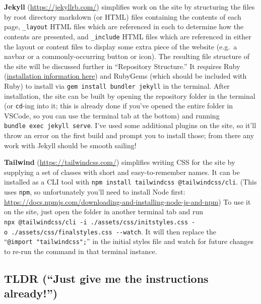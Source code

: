 \documentclass[
]{book}
\begin{document}
\textbf{Jekyll} (\url{https://jekyllrb.com/}) simplifies work on the site by structuring the files by root directory markdown (or HTML) files containing the contents of each page, \texttt{\_layout} HTML files which are referenced in each to determine how the contents are presented, and \texttt{\_include} HTML files which are referenced in either the layout or content files to display some extra piece of the website (e.g.~a navbar or a commonly-occurring button or icon). The resulting file structure of the site will be discussed further in ``Repository Structure.'' It requires Ruby (\href{https://www.ruby-lang.org/en/documentation/installation/}{installation information here}) and RubyGems (which should be included with Ruby) to install via \texttt{gem\ install\ bundler\ jekyll} in the terminal. After installation, the site can be built by opening the repository folder in the terminal (or \texttt{cd}-ing into it; this is already done if you've opened the entire folder in VSCode, so you can use the terminal tab at the bottom) and running \texttt{bundle\ exec\ jekyll\ serve}. I've used some additional plugins on the site, so it'll throw an error on the first build and prompt you to install those; from there any work with Jekyll should be smooth sailing!

\textbf{Tailwind} (\url{https://tailwindcss.com/}) simplifies writing CSS for the site by supplying a set of classes with short and easy-to-remember names. It can be installed as a CLI tool with \texttt{npm\ install\ tailwindcss\ @tailwindcss/cli}. (This uses \texttt{npm}, so unfortunately you'll need to install Node first: \url{https://docs.npmjs.com/downloading-and-installing-node-js-and-npm}) To use it on the site, just open the folder in another terminal tab and run \texttt{npx\ @tailwindcss/cli\ -i\ ./assets/css/initstyles.css\ -o\ ./assets/css/finalstyles.css\ -\/-watch}. It will then replace the ``\texttt{@import\ "tailwindcss";}'' in the initial styles file and watch for future changes to re-run the command in that terminal instance.

\subsection{TLDR (``Just give me the instructions already!'')}\label{tldr-just-give-me-the-instructions-already}
\end{document}
